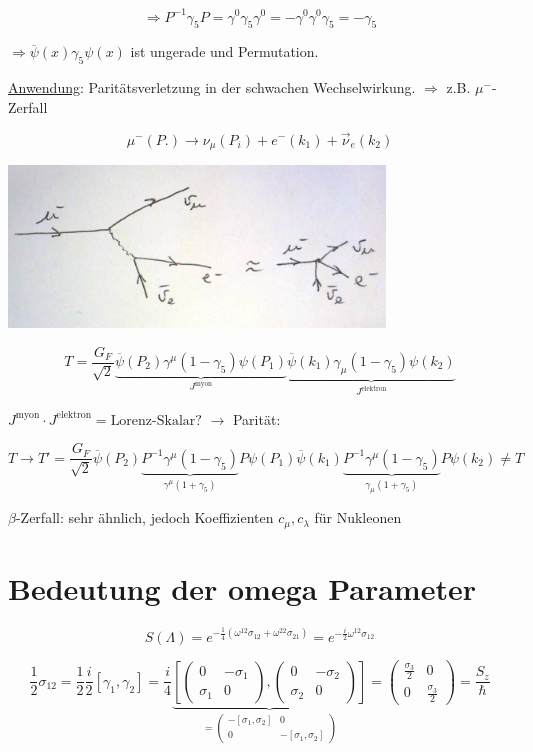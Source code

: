 \[\Rightarrow P^{-1}\gamma_5 P = \gamma^0\gamma_5\gamma^0 = -\gamma^0\gamma^0\gamma_5 = -\gamma_5\]

\(\Rightarrow \overline\psi(x) \gamma_5\psi(x)\) ist ungerade und Permutation.

\underline{Anwendung}: Paritätsverletzung in der schwachen Wechselwirkung. \(\Rightarrow \) z.B. \(\mu^-\)-Zerfall

\[\mu^-(P.) \rightarrow \nu_\mu(P_i) + e^-(k_1) + \vec \nu_e(k_2)\]


 \includegraphics[width=0.75\textwidth]{kap06_01.png}


\[T= \frac{G_F}{\sqrt{2}}\underbrace{  \overline\psi(P_2)\gamma^\mu(1-\gamma_5)\psi(P_1)}_{J^{\text{myon}}} \underbrace{\overline\psi(k_1)\gamma_\mu(1-\gamma_5)\psi(k_2)}_{J^{\text{elektron}}}\]


\(J^{\text{myon}}\cdot J^{\text{elektron}} = \text{Lorenz-Skalar?}\) \(\rightarrow \) Parität:

\[T\rightarrow T' =\frac{G_F}{\sqrt{2}} \overline\psi(P_2)\underbrace{P^{-1}\gamma^\mu(1-\gamma_5)}_{\gamma^\mu (1+\gamma_5)} P \psi(P_1)   \overline\psi(k_1)\underbrace{P^{-1}\gamma^\mu(1-\gamma_5)}_{\gamma_\mu (1+\gamma_5)} P \psi(k_2) \neq T\]

\(\beta\)-Zerfall: sehr ähnlich, jedoch Koeffizienten \(c_\mu,c_\lambda\) für Nukleonen


\section{Bedeutung der omega Parameter}

\[S(\Lambda) = e^{-\frac{1}{4}(\omega^{12}\sigma_{12}+\omega^{22}\sigma_{21})}= e^{-\frac{i}{2}\omega^{12}\sigma_{12}}\]

\[\frac{1}{2}\sigma_{12} = \frac{1}{2}\frac{i}{2}[\gamma_1,\gamma_2] = \frac{i}{4}\underbrace{\left[ \begin{pmatrix} 0&-\sigma_1\\   \sigma_1&0 \end{pmatrix}, \begin{pmatrix} 0&-\sigma_2\\   \sigma_2&0 \end{pmatrix} \right]}_{=  \begin{pmatrix} -[\sigma_1,\sigma_2]&0\\  0&- [\sigma_1,\sigma_2] \end{pmatrix}  } =  \begin{pmatrix} \frac{\sigma_3}{2}&0\\0& \frac{\sigma_3}{2} \end{pmatrix} = \frac{S_z}{\hbar} \]


